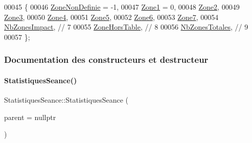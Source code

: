 \begin{DoxyCode}
00045         \{
00046             \hyperlink{class_statistiques_seance_aa839f5192cbadd7c3fb3651d62eff8b5afaee4b0051f413cbba9651905daeba28}{ZoneNonDefinie} = -1,
00047             \hyperlink{class_statistiques_seance_aa839f5192cbadd7c3fb3651d62eff8b5a3aa1c8dd53092c489bf5b27952c898ac}{Zone1} = 0,
00048             \hyperlink{class_statistiques_seance_aa839f5192cbadd7c3fb3651d62eff8b5acf74b44f34352af881c12d4fb4698727}{Zone2},
00049             \hyperlink{class_statistiques_seance_aa839f5192cbadd7c3fb3651d62eff8b5acdc3da6ca403f3a4ae3e11a10e7d9bbb}{Zone3},
00050             \hyperlink{class_statistiques_seance_aa839f5192cbadd7c3fb3651d62eff8b5abbf773e4fc35c934fee03e377f89e84c}{Zone4},
00051             \hyperlink{class_statistiques_seance_aa839f5192cbadd7c3fb3651d62eff8b5a0ed753df79f18c07d46dfc3afeb8a344}{Zone5},
00052             \hyperlink{class_statistiques_seance_aa839f5192cbadd7c3fb3651d62eff8b5a012027bd30be4ea847690179ba948343}{Zone6},
00053             \hyperlink{class_statistiques_seance_aa839f5192cbadd7c3fb3651d62eff8b5a196adb885d7fd7109e451e759564ea64}{Zone7},
00054             \hyperlink{class_statistiques_seance_aa839f5192cbadd7c3fb3651d62eff8b5a4623fc9051358f3d82fdccd5047d3736}{NbZonesImpact}, \textcolor{comment}{// 7}
00055             \hyperlink{class_statistiques_seance_aa839f5192cbadd7c3fb3651d62eff8b5aeb6ef225df9153e1f46a968ae71bf2f3}{ZoneHorsTable}, \textcolor{comment}{// 8}
00056             \hyperlink{class_statistiques_seance_aa839f5192cbadd7c3fb3651d62eff8b5afe19f73563963b5160847cdd8c2260c4}{NbZonesTotales}, \textcolor{comment}{// 9}
00057         \};
\end{DoxyCode}


\subsubsection{Documentation des constructeurs et destructeur}
\mbox{\label{class_statistiques_seance_ab4096821bf4cb5fbebcf895b1a70be42}} 
\paragraph{\texorpdfstring{Statistiques\+Seance()}{StatistiquesSeance()}}
{\footnotesize\ttfamily Statistiques\+Seance\+::\+Statistiques\+Seance (\begin{DoxyParamCaption}\item[{Q\+Object $\ast$}]{parent = {\ttfamily nullptr} }\end{DoxyParamCaption})}



